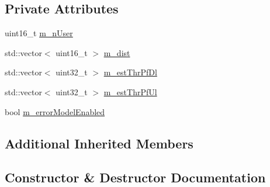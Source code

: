 \subsection*{Private Attributes}
\begin{DoxyCompactItemize}
\item 
uint16\+\_\+t \hyperlink{classLenaPfFfMacSchedulerTestCase2_a48ae704964f6973d4c7a957cb7d673da}{m\+\_\+n\+User}
\item 
std\+::vector$<$ uint16\+\_\+t $>$ \hyperlink{classLenaPfFfMacSchedulerTestCase2_a3a24b311686a784d71b6b0ca3de77e2e}{m\+\_\+dist}
\item 
std\+::vector$<$ uint32\+\_\+t $>$ \hyperlink{classLenaPfFfMacSchedulerTestCase2_a70f0ce5ce01c89fd7e810c1862abae09}{m\+\_\+est\+Thr\+Pf\+Dl}
\item 
std\+::vector$<$ uint32\+\_\+t $>$ \hyperlink{classLenaPfFfMacSchedulerTestCase2_a46559fc558ba40a865de7f13f7aed13c}{m\+\_\+est\+Thr\+Pf\+Ul}
\item 
bool \hyperlink{classLenaPfFfMacSchedulerTestCase2_a5c5c82104effa24452b35b7da0eda70e}{m\+\_\+error\+Model\+Enabled}
\end{DoxyCompactItemize}
\subsection*{Additional Inherited Members}


\subsection{Constructor \& Destructor Documentation}
